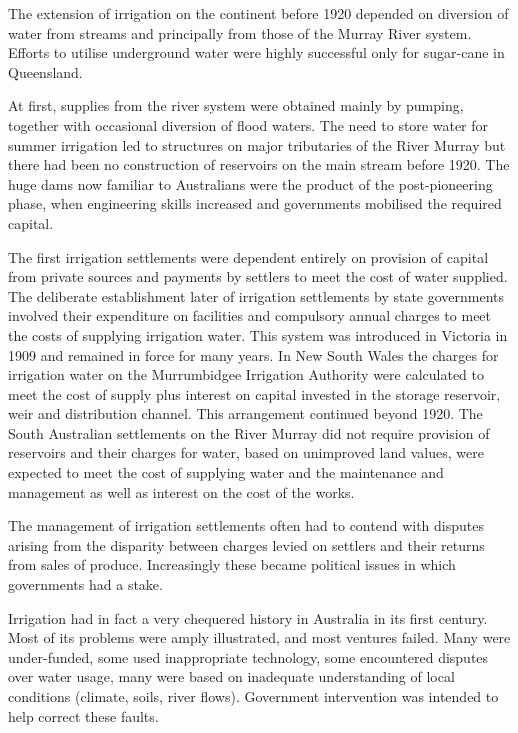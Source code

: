 The extension of irrigation on the continent before 1920 depended on
diversion of water from streams and principally from those of the
Murray River system.  Efforts to utilise underground water were highly
successful only for sugar-cane in Queensland.

At first, supplies from the river system were obtained mainly by
pumping, together with occasional diversion of flood waters.  The need
to store water for summer irrigation led to structures on major
tributaries of the River Murray but there had been no construction of
reservoirs on the main stream before 1920. The huge dams now familiar
to Australians were the product of the post-pioneering phase, when
engineering skills increased and governments mobilised the required
capital.

\bigskip\noindent
The first irrigation settlements were dependent entirely on provision
of capital from private sources and payments by settlers to meet the
cost of water supplied.  The deliberate establishment later of
irrigation settlements by state governments involved their expenditure
on facilities and compulsory annual charges to meet the costs of
supplying irrigation water.  This system was introduced in Victoria in
1909 and remained in force for many years.  In New South Wales the
charges for irrigation water on the Murrumbidgee Irrigation Authority
were calculated to meet the cost of supply plus interest on capital
invested in the storage reservoir, weir and distribution channel.
This arrangement continued beyond 1920.  The South Australian
settlements on the River Murray did not require provision of
reservoirs and their charges for water, based on unimproved land
values, were expected to meet the cost of supplying water and the
maintenance and management as well as interest on the cost of the
works.

The management of irrigation settlements often had to contend with
disputes arising from the disparity between charges levied on settlers
and their returns from sales of produce. Increasingly these became
political issues in which governments had a stake.

\bigskip\noindent
Irrigation had in fact a very chequered history in Australia in its
first century. Most of its problems were amply illustrated, and most
ventures failed. Many were under-funded, some used inappropriate
technology, some encountered disputes over water usage, many were
based on inadequate understanding of local conditions (climate, soils,
river flows). Government intervention was intended to help correct
these faults.

